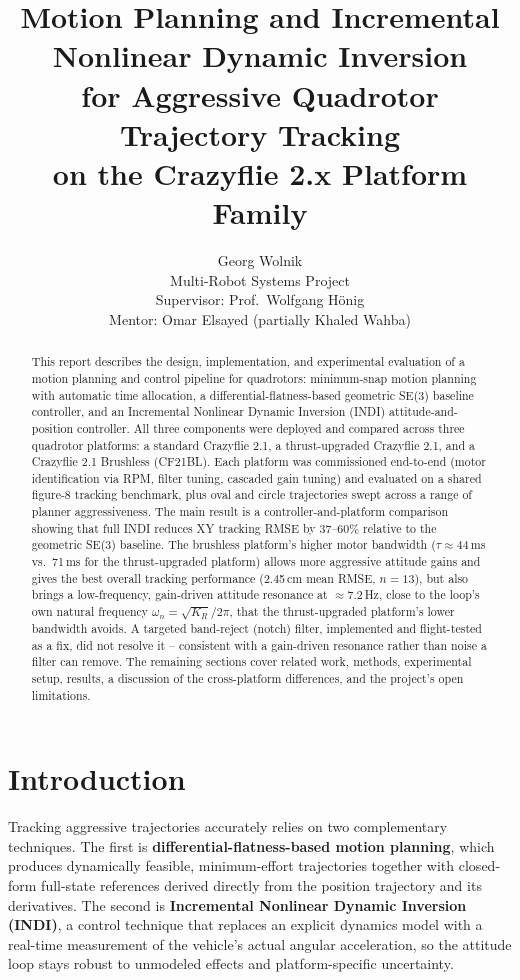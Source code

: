 \documentclass[11pt,a4paper]{article}
\title{\color{frcblue}Motion Planning and Incremental Nonlinear Dynamic Inversion\\
for Aggressive Quadrotor Trajectory Tracking\\
on the Crazyflie 2.x Platform Family}
\author{Georg Wolnik \\ \small Multi-Robot Systems Project \\
\small Supervisor: Prof.\ Wolfgang H\"onig \\ \small Mentor: Omar Elsayed (partially Khaled Wahba)}
\date{}
\begin{document}
\maketitle

\begin{abstract}
This report describes the design, implementation, and experimental evaluation of a motion
planning and control pipeline for quadrotors: minimum-snap motion planning with automatic time
allocation, a differential-flatness-based geometric SE(3) baseline controller, and an Incremental
Nonlinear Dynamic Inversion (INDI) attitude-and-position controller. All three components were
deployed and compared across three quadrotor platforms: a standard Crazyflie 2.1, a
thrust-upgraded Crazyflie 2.1, and a Crazyflie 2.1 Brushless (CF21BL). Each platform was
commissioned end-to-end (motor identification via RPM, filter tuning, cascaded gain tuning) and
evaluated on a shared figure-8 tracking benchmark, plus oval and circle trajectories swept across
a range of planner aggressiveness. The main result is a controller-and-platform comparison
showing that full INDI reduces XY tracking RMSE by 37--60\% relative to the geometric SE(3)
baseline. The brushless platform's higher motor bandwidth ($\tau\approx44$\,ms vs.\ 71\,ms for the
thrust-upgraded platform) allows more aggressive attitude gains and gives the best overall
tracking performance (2.45\,cm mean RMSE, $n=13$), but also brings a low-frequency, gain-driven
attitude resonance at $\approx7.2$\,Hz, close to the loop's own natural frequency
$\omega_n=\sqrt{K_R}/2\pi$, that the thrust-upgraded platform's lower bandwidth avoids. A targeted
band-reject (notch) filter, implemented and flight-tested as a fix, did not resolve it --
consistent with a gain-driven resonance rather than noise a filter can remove. The remaining
sections cover related work, methods, experimental setup, results, a discussion of the
cross-platform differences, and the project's open limitations.
\end{abstract}

\section{Introduction}

Tracking aggressive trajectories accurately relies on two complementary techniques. The first is
\textbf{differential-flatness-based motion planning}, which produces dynamically feasible,
minimum-effort trajectories together with closed-form full-state references derived directly from
the position trajectory and its derivatives. The second is \textbf{Incremental Nonlinear Dynamic
Inversion (INDI)}, a control technique that replaces an explicit dynamics model with a real-time
measurement of the vehicle's actual angular acceleration, so the attitude loop stays robust to
unmodeled effects and platform-specific uncertainty.
\end{document}

